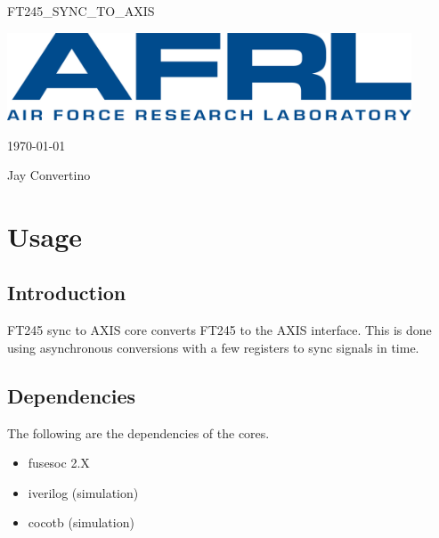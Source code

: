 \begin{titlepage}
  \begin{center}

  {\Huge FT245\_SYNC\_TO\_AXIS}

  \vspace{25mm}

  \includegraphics[width=0.90\textwidth,height=\textheight,keepaspectratio]{img/AFRL.png}

  \vspace{25mm}

  \today

  \vspace{15mm}

  {\Large Jay Convertino}

  \end{center}
\end{titlepage}

\tableofcontents

\newpage

\section{Usage}

\subsection{Introduction}

\par
FT245 sync to AXIS core converts FT245 to the AXIS interface. This is done using asynchronous conversions with a few registers to sync signals in time.

\subsection{Dependencies}

\par
The following are the dependencies of the cores.

\begin{itemize}
  \item fusesoc 2.X
  \item iverilog (simulation)
  \item cocotb (simulation)
\end{itemize}

